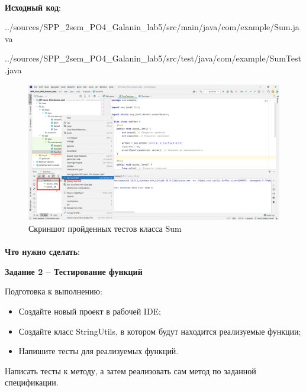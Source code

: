 \documentclass[12pt, a4paper, simple]{eskdtext}
\begin{document}
    \paragraph{} \textbf{Исходный код}: 

    
    {../sources/SPP_2sem_PO4_Galanin_lab5/src/main/java/com/example/Sum.java}

    
    {../sources/SPP_2sem_PO4_Galanin_lab5/src/test/java/com/example/SumTest.java}

    \begin{figure}[!h]
        \centering
        \includegraphics[width=16cm]
            {_assets/SumTest.png}
        \caption{Скриншот пройденных тестов класса Sum}
    \end{figure}

    \newpage

    \paragraph{} \textbf{Что нужно сделать}:

    \textbf{Задание 2 – Тестирование функций}

    Подготовка к выполнению:
  
    \begin{itemize}
        \item Создайте новый проект в рабочей IDE;
        \item Создайте класс StringUtils, в котором будут находится реализуемые функции;
        \item Напишите тесты для реализуемых функций.
    \end{itemize}

    Написать тесты к методу, а затем реализовать сам метод по заданной спецификации.
    
\end{document}
